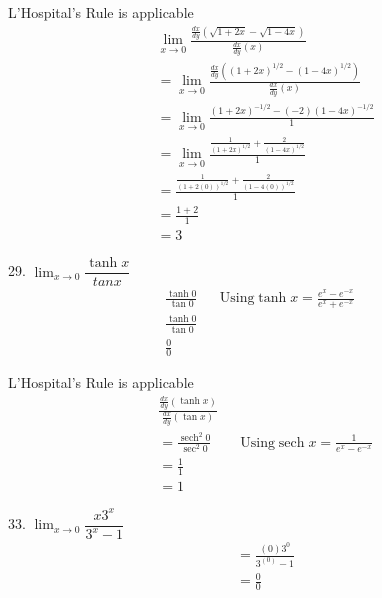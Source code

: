 \documentclass{article}
\DeclareMathOperator{\sech}{sech}
\begin{document}
\begin{description}
\begin{description}
                L'Hospital's Rule is applicable
                \begin{align*}
                   & \lim_{x\to0}\frac{\frac{dx}{dy}(\sqrt{1 + 2x} - \sqrt{1 - 4x})}{\frac{dx}{dy}(x)}     \\[1em]
                   & = \lim_{x\to0}\frac{\frac{dx}{dy}((1 + 2x)^{1/2} - (1 - 4x)^{1/2})}{\frac{dx}{dy}(x)} \\[1em]
                   & = \lim_{x\to0}\frac{(1 + 2x)^{-1/2}-  (-2)(1 - 4x)^{-1/2}}{1}                         \\[1em]
                   & = \lim_{x\to0}\frac{\frac{1}{(1 + 2x)^{1/2}} +  \frac{2}{(1 - 4x)^{1/2}}}{1}          \\[1em]
                   & = \frac{\frac{1}{(1 + 2(0))^{1/2}} +  \frac{2}{(1 - 4(0))^{1/2}}}{1}                  \\[1em]
                   & = \frac{1 +  2}{1}                                                                    \\[1em]
                   & = \boxed{3}
                \end{align*}
          \item 29. $\lim_{x\to0} \dfrac{\tanh{x}}{tan{x}}$
                \begin{align*}
                  \frac{\tanh{0}}{\tan{0}} &  & \text{Using} \tanh{x}= \frac{e^x - e^{-x}}{e^x + e^{-x}} \\[1em]
                  \frac{\tanh{0}}{\tan{0}}                                                               \\[1em]
                  \frac{0}{0}
                \end{align*}

                L'Hospital's Rule is applicable
                \begin{align*}
                   & \frac{\frac{dx}{dy}(\tanh{x})}{\frac{dx}{dy}(\tan{x})}                                                    \\[1em]
                   & =    \frac{\sech^2{0}}{\sec^2{0}}                      &  & \text{Using} \sech{x}= \frac{1}{e^x - e^{-x}} \\[1em]
                   & =    \frac{1}{1}                                                                                          \\[1em]
                   & =    \boxed{1}
                \end{align*}
          \item 33. $\lim_{x\to0} \dfrac{x3^x}{3^x-1}$
                \begin{align*}
                   & =\frac{(0)3^0}{3^(0)-1} \\[1em]
                   & =\frac{0}{0}            \\
                \end{align*}


\end{description}
\end{description}
\end{document}
